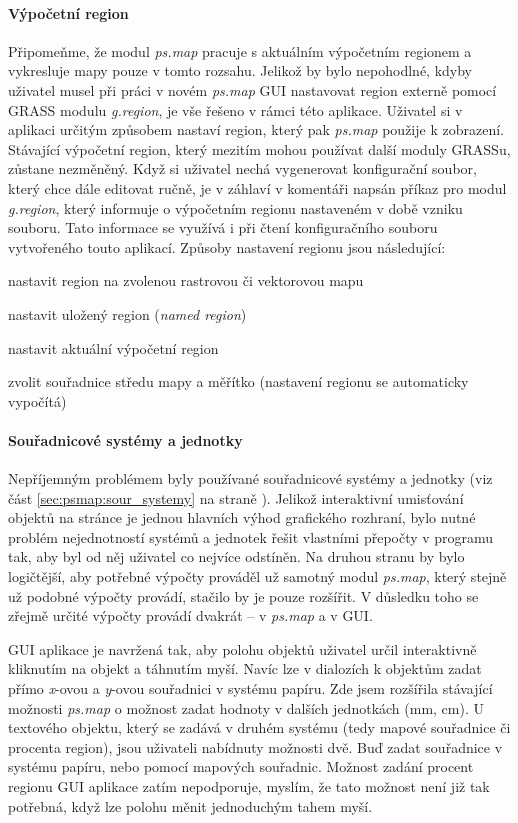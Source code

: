 \documentclass[a4paper,12pt,draft]{article}
\newcommand{\modul}[1]{\emph{#1}}
\begin{document}
\paragraph*{Výpočetní region} Připomeňme, že modul \modul{ps.map}
pracuje s aktuálním výpočetním regionem a vykresluje mapy pouze v tomto
rozsahu. Jelikož by bylo nepohodlné, kdyby uživatel musel při práci v
novém \modul{ps.map} GUI nastavovat region externě pomocí GRASS modulu
\modul{g.region}, je vše řešeno v rámci této aplikace. Uživatel si
v aplikaci určitým způsobem nastaví region, který pak \modul{ps.map}
použije k zobrazení. Stávající výpočetní region, který mezitím
mohou používat další moduly GRASSu, zůstane nezměněný. Když si
uživatel nechá vygenerovat konfigurační soubor, který chce dále
editovat ručně, je v záhlaví v komentáři napsán příkaz pro modul
\modul{g.region}, který informuje o výpočetním regionu nastaveném v době
vzniku souboru. Tato informace se využívá i při čtení konfiguračního
souboru vytvořeného touto aplikací.  Způsoby nastavení regionu jsou
následující:
\begin{enumerate*}
    \item nastavit region na zvolenou rastrovou či vektorovou mapu
    \item nastavit uložený region (\emph{named region})
    \item nastavit aktuální výpočetní region
    \item zvolit souřadnice středu mapy a měřítko (nastavení regionu
    se automaticky vypočítá)
\end{enumerate*}


\paragraph*{Souřadnicové systémy a jednotky} Nepříjemným problémem
byly používané souřadnicové systémy a jednotky (viz část
\ref{sec:psmap:sour_systemy} na straně \pageref{sec:psmap:sour_systemy}).
 Jelikož interaktivní umisťování objektů na stránce je jednou hlavních
 výhod grafického rozhraní, bylo nutné problém nejednotností systémů
 a jednotek řešit vlastními přepočty v programu tak, aby byl od něj
 uživatel co nejvíce odstíněn. Na druhou stranu by bylo logičtější,
 aby potřebné výpočty prováděl už samotný modul \modul{ps.map},
 který stejně už podobné výpočty provádí, stačilo by je pouze
 rozšířit. V důsledku toho se zřejmě určité výpočty provádí
 dvakrát -- v \modul{ps.map} a v GUI.

 GUI aplikace je navržená tak, aby polohu objektů uživatel určil
 interaktivně kliknutím na objekt a táhnutím myší. Navíc lze
 v dialozích k objektům zadat přímo \emph{x}-ovou a \emph{y}-ovou
 souřadnici v systému papíru. Zde jsem rozšířila stávající možnosti
 \modul{ps.map} o možnost zadat hodnoty v dalších jednotkách (mm, cm).
 U textového objektu, který se zadává v druhém systému (tedy mapové
 souřadnice či procenta region), jsou uživateli nabídnuty možnosti
 dvě. Buď zadat souřadnice v systému papíru, nebo pomocí mapových
 souřadnic. Možnost zadání procent regionu GUI aplikace zatím nepodporuje,
 myslím, že tato možnost není již tak potřebná, když lze polohu
 měnit jednoduchým tahem myší.
\end{document}
